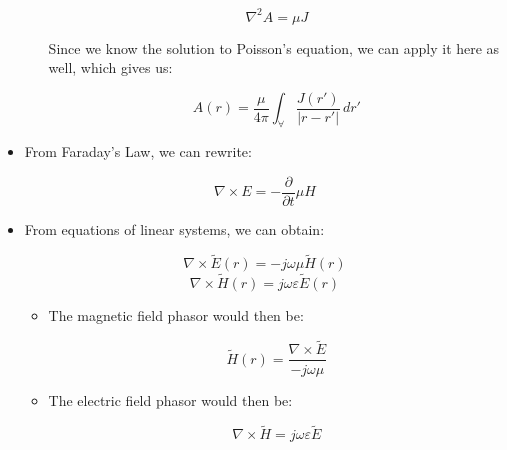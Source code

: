 \begin{itemize}
\begin{itemize}
        $$\nabla^2 A=\mu J$$

        Since we know the solution to Poisson's equation, we can apply it here as well, which gives us:

        $$A(r)=\frac{\mu}{4\pi}\int_{\forall}\frac{J(r')}{|r-r'|}\,dr'$$

    \end{itemize}

  \item From Faraday's Law, we can rewrite:

    $$\nabla\times E=-\frac{\partial}{\partial t}\mu H$$

  \item From equations of linear systems, we can obtain:

    $$\nabla\times\tilde{E}(r)=-j\omega\mu\tilde{H}(r)$$
    $$\nabla\times\tilde{H}(r)=j\omega\varepsilon\tilde{E}(r)$$

    \begin{itemize}

      \item The magnetic field phasor would then be:

        $$\tilde{H}(r)=\frac{\nabla\times\tilde{E}}{-j\omega\mu}$$

      \item The electric field phasor would then be:

        $$\nabla\times\tilde{H}=j\omega\varepsilon\tilde{E}$$

    \end{itemize}

\end{itemize}



